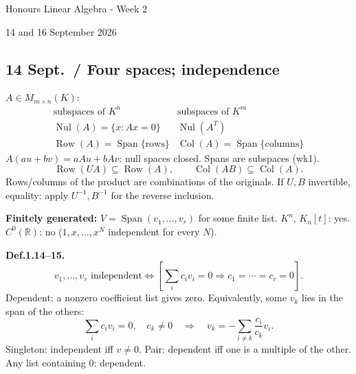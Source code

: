 \documentclass[11pt,letterpaper]{article}
\begin{document}
\begin{center}
{\LARGE Honours Linear Algebra - Week 2\par}
\vspace{5pt}
{\large 14 and 16 September 2026\par}
\end{center}
\vspace{4pt}
\subsection{14 Sept.~/ Four spaces;
independence}\label{sept.-four-spaces-independence}

\(A\in M_{m\times n}(K)\): \[
\begin{array}{c|c}
\text{subspaces of }K^n&\text{subspaces of }K^m\\\hline
\operatorname{Nul}(A)=\{x:Ax=0\}&\operatorname{Nul}(A^T)\\
\operatorname{Row}(A)=\operatorname{Span}\{\text{rows}\}
&\operatorname{Col}(A)=\operatorname{Span}\{\text{columns}\}
\end{array}
\] \(A(au+bv)=aAu+bAv\): null spaces closed. Spans are subspaces (wk1).
\[
\operatorname{Row}(UA)\subseteq\operatorname{Row}(A),\qquad
\operatorname{Col}(AB)\subseteq\operatorname{Col}(A).
\] Rows/columns of the product are combinations of the originals. If
\(U,B\) invertible, equality: apply \(U^{-1},B^{-1}\) for the reverse
inclusion.

\textbf{Finitely generated:} \(V=\operatorname{Span}(v_1,\ldots,v_r)\)
for some finite list. \(K^n\), \(K_n[t]\): yes. \(C^0(\mathbb R)\): no
(\(1,x,\ldots,x^N\) independent for every \(N\)).

\textbf{Def.1.14--15.} \[
v_1,\ldots,v_r\text{ independent}
\iff \left[\sum_i c_iv_i=0\Rightarrow c_1=\cdots=c_r=0\right].
\] Dependent: a nonzero coefficient list gives zero. Equivalently, some
\(v_k\) lies in the span of the others: \[
\sum_i c_iv_i=0,\quad c_k\ne0
\quad\Rightarrow\quad v_k=-\sum_{i\ne k}\frac{c_i}{c_k}v_i.
\] Singleton: independent iff \(v\ne0\). Pair: dependent iff one is a
multiple of the other. Any list containing \(0\): dependent.
\end{document}
